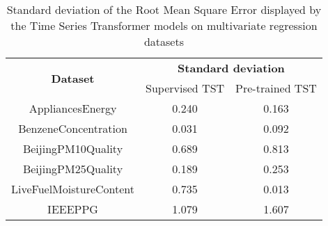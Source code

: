 \documentclass{article} \usepackage{iclr2021_conference,times}
\begin{document}
\begin{table}
\centering
\begin{tabular}{|c|c|c|} 
\hline
\multirow{2}{*}{ \textbf{Dataset}} & \multicolumn{2}{c|}{\textbf{Standard deviation}}  \\ 
\cline{2-3}
                                   & Supervised TST & Pre-trained TST                  \\ 
\hline
AppliancesEnergy                   & 0.240          & 0.163                            \\
BenzeneConcentration               & 0.031          & 0.092                            \\
BeijingPM10Quality                 & 0.689          & 0.813                            \\
BeijingPM25Quality                 & 0.189          & 0.253                            \\
LiveFuelMoistureContent            & 0.735          & 0.013                            \\
IEEEPPG                            & 1.079          & 1.607                            \\
\hline
\end{tabular}
\caption{Standard deviation of the Root Mean Square Error displayed by the Time Series Transformer models on multivariate regression datasets}
\label{tab:std_regression_datasets}
\end{table}
\end{document}
